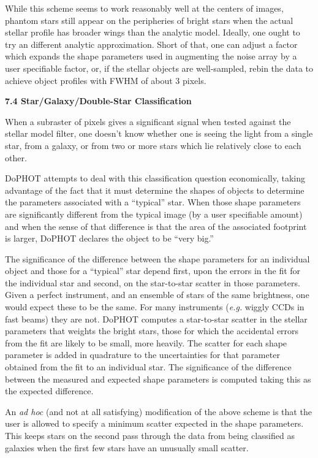 While this scheme seems to work reasonably well at the
centers of images, phantom stars still appear on the
peripheries of bright stars when the actual stellar profile
has broader wings than the analytic model.  Ideally, one
ought to try an different analytic approximation.  Short of
that, one can adjust a factor which expands the shape
parameters used in augmenting the noise array by a user
specifiable factor, or, if the stellar objects are well-sampled, rebin
the data to achieve object profiles with FWHM of about 3 pixels.

\centerline{\bf 7.4 Star/Galaxy/Double-Star Classification}

When a subraster of pixels gives a significant signal when
tested against the stellar model filter, one doesn't know
whether one is seeing the light from a single star, from a
galaxy, or from two or more stars which lie relatively close
to each other.  

DoPHOT attempts to deal with this classification question
economically, taking advantage of the fact that it must
determine the shapes of objects to determine the parameters
associated with a ``typical'' star.  When those shape parameters
are significantly different from the typical image (by a
user specifiable amount) and when the sense of that
difference is that the area of the associated footprint is
larger, DoPHOT declares the object to be ``very big.''

The significance of the difference between the shape
parameters for an individual object and those for a
``typical'' star depend first, upon the errors in the fit
for the individual star and second, on the star-to-star
scatter in those parameters.  Given a perfect instrument,
and an ensemble of stars of the same brightness, one would
expect these to be the same.  For many instruments ({\it e.g.}
wiggly CCDs in fast beams) they are not.  DoPHOT computes a
star-to-star scatter in the stellar parameters that weights
the bright stars, those for which the accidental errors from
the fit are likely to be small, more heavily.  The scatter
for each shape parameter is added in quadrature to the
uncertainties for that parameter obtained from the fit to an
individual star.  The significance of the difference between
the measured and expected shape parameters is computed
taking this as the expected difference.

An {\it ad hoc} (and not at all satisfying) modification of the
above scheme is that the user is allowed to specify a
minimum scatter expected in the shape parameters.  This
keeps stars on the second pass through the data from being
classified as galaxies when the first few stars have an
unusually small scatter.


